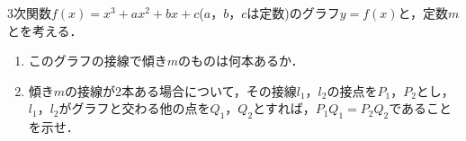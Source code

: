 \documentclass[../../main.tex]{subfiles}
\begin{document}
3次関数$f(x)=x^3+ax^2+bx+c$($a$，$b$，$c$は定数)のグラフ$y=f(x)$と，定数$m$とを考える．
\begin{enumerate}
  \item このグラフの接線で傾き$m$のものは何本あるか．
  \item 傾き$m$の接線が2本ある場合について，その接線$l_1$，$l_2$の接点を$P_1$，$P_2$とし，
    $l_1$，$l_2$がグラフと交わる他の点を$Q_1$，$Q_2$とすれば，$P_1Q_1=P_2Q_2$であることを示せ．
\end{enumerate}
\end{document}
